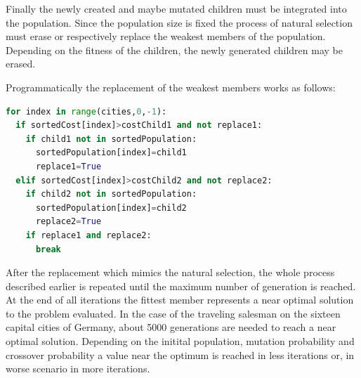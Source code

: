 \documentclass[11pt,a4paper]{article}
\begin{document}
Finally the newly created and maybe mutated children must be integrated into the population. Since the population size is fixed the process of natural selection must erase or respectively replace the weakest members of the population. Depending on the fitness of the children, the newly generated children may be erased.

Programmatically the replacement of the weakest members works as follows:\\

\begin{lstlisting}[language=Python]
for index in range(cities,0,-1):
  if sortedCost[index]>costChild1 and not replace1:
    if child1 not in sortedPopulation:
      sortedPopulation[index]=child1
      replace1=True
  elif sortedCost[index]>costChild2 and not replace2:
    if child2 not in sortedPopulation:
      sortedPopulation[index]=child2
      replace2=True
    if replace1 and replace2:
      break
\end{lstlisting}

After the replacement which mimics the natural selection, the whole process described earlier is repeated until the maximum number of generation is reached. At the end of all iterations the fittest member represents a near optimal solution to the problem evaluated. In the case of the traveling salesman on the sixteen capital cities of Germany, about 5000 generations are needed to reach a near optimal solution. Depending on the initital population, mutation probability and crossover probability a value near the optimum is reached in less iterations or, in worse scenario in more iterations.

\nocite{*}
\printbibliography
{}
\end{document}
